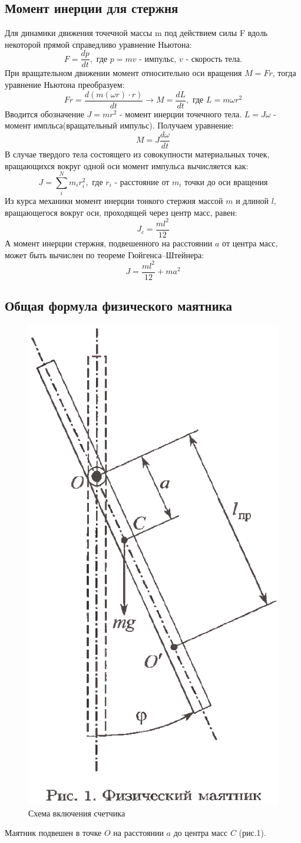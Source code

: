 \documentclass[a4paper]{article}
\begin{document}
\subsection{Момент инерции для стержня}
Для динамики движения точечной массы m под действием
силы F вдоль некоторой прямой справедливо уравнение Ньютона:
\[F = \frac{dp}{dt},\text{  где $p = mv$ - импульс, $v$ - скорость тела.}\]
При вращательном движении момент относительно оси вращения $M = Fr$, тогда уравнение Ньютона преобразуем:
\[Fr = \frac{d(m(\omega r) \cdot r)}{dt} \longrightarrow M = \frac{dL}{dt}, \text{ где $L = m\omega r^2$}\]
Вводится обозначение $J = m r^2$ - момент инерции точечного тела. $ L = J\omega$ - момент импльса(вращательный импульс). Получаем уравнение:
\[M = J\frac{d\omega}{dt}\]
В случае твердого тела состоящего из совокупности материальных точек, вращающихся вокруг одной оси момент импульса вычисляется как:
\[J = \sum\limits_{i}^{N} m_{i}r_{i}^2, \text{ где $r_{i}$ - расстояние от $m_{i}$ точки до оси вращения}\]
Из курса механики момент инерции тонкого стержня массой $m$ и длиной $l$, вращающегося вокруг оси, проходящей через центр масс, равен:
\[J_{c} = \frac{ml^2}{12}\]
А момент инерции стержня, подвешенного на расстоянии $a$ от центра масс, может быть вычислен по теореме Гюйгенса–Штейнера: 
\[J = \frac{ml^2}{12} + ma^2\]

\subsection{Общая формула физического маятника}

\begin{figure}
\centering
\includegraphics[width=.25\textwidth]{shema.png}
\caption{Схема включения счетчика}
\end{figure}

Маятник подвешен в точке $O$ на расстоянии $a$ до центра масс $C$ (рис.1).
\end{document}
